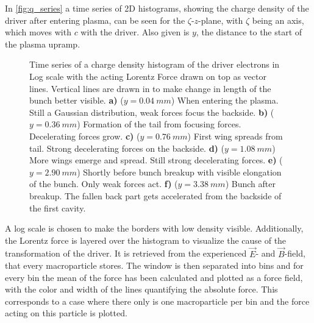 \documentclass[bachelor_thesis]{subfiles}
\begin{document}
In \autoref{fig:q_series} a time series of 2D histograms, showing the charge density of the driver after entering plasma, can be seen for the $\zeta$-$z$-plane, with $\zeta$ being an axis, which moves with $c$ with the driver. Also given is $y$, the distance to the start of the plasma upramp.
\begin{figure}
	\centering
	
	\caption{Time series of a charge density histogram of the driver electrons in Log scale with the acting Lorentz Force drawn on top as vector lines. Vertical lines are drawn in to make change in length of the bunch better visible. 
	\textbf{a)} ($y=\qty{0.04}{mm}$) When entering the plasma. Still a Gaussian distribution, weak forces focus the backside.
	\textbf{b)} ($y=\qty{0.36}{mm}$) Formation of the tail from focusing forces. Decelerating forces grow.
	\textbf{c)} ($y=\qty{0.76}{mm}$) First wing spreads from tail. Strong decelerating forces on the backside.
	\textbf{d)} ($y=\qty{1.08}{mm}$) More wings emerge and spread. Still strong decelerating forces.
	\textbf{e)} ($y=\qty{2.90}{mm}$) Shortly before bunch breakup with visible elongation of the bunch. Only weak forces act.
	\textbf{f)} ($y=\qty{3.38}{mm}$) Bunch after breakup. The fallen back part gets accelerated from the backside of the first cavity.}
	\label{fig:q_series}
\end{figure}
A log scale is chosen to make the borders with low density visible. Additionally, the Lorentz force is layered over the histogram to visualize the cause of the transformation of the driver. It is retrieved from the experienced $\vec{E}$- and $\vec{B}$-field, that every macroparticle stores.
The window is then separated into bins and for every bin the mean of the force has been calculated and plotted as a force field, with the color and width of the lines quantifying the absolute force. 
This corresponds to a case where there only is one macroparticle per bin and the force acting on this particle is plotted.
\end{document}
